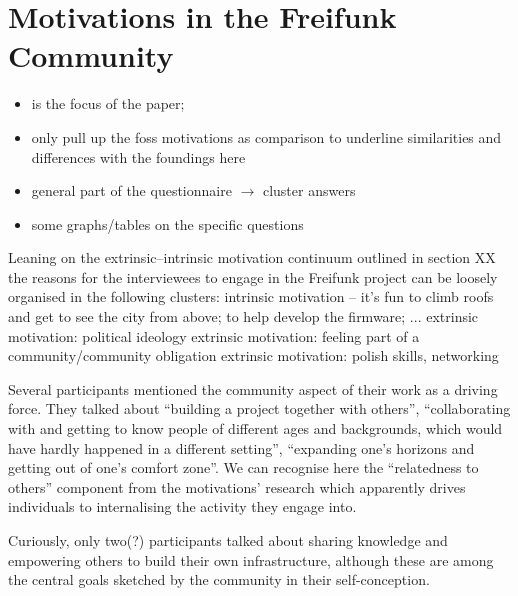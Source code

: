 \section{Motivations in the Freifunk Community}

\begin{itemize}
  \item is the focus of the paper;
  \item only pull up the foss motivations as comparison to underline similarities and differences with the foundings here
  \item general part of the questionnaire $\rightarrow$ cluster answers
  \item some graphs/tables on the specific questions
\end{itemize}

Leaning on the extrinsic--intrinsic motivation continuum outlined in section XX the reasons for the interviewees to engage in the Freifunk project can be loosely organised in the following clusters:
intrinsic motivation -- it's fun to climb roofs and get to see the city from above; to help develop the firmware; ...
extrinsic motivation: political ideology
extrinsic motivation: feeling part of a community/community obligation
extrinsic motivation: polish skills, networking




Several participants mentioned the community aspect of their work as a driving force.
They talked about ``building a project together with others'', ``collaborating with and getting to know people of different ages and backgrounds, which would have hardly happened in a different setting'', ``expanding one's horizons and getting out of one's comfort zone''.
We can recognise here the ``relatedness to others'' component from the motivations' research which apparently drives individuals to internalising the activity they engage into.

Curiously, only two(?) participants talked about sharing knowledge and empowering others to build their own infrastructure, although these are among the central goals sketched by the community in their self-conception\cite{ffweb}.


